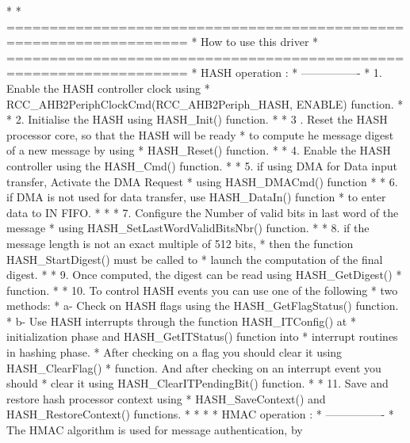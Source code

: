 \begin{DoxyVerb}*                               
*          ===================================================================      
*                                   How to use this driver
*          ===================================================================
*          HASH operation : 
*          ----------------                   
*         1. Enable the HASH controller clock using 
*            RCC_AHB2PeriphClockCmd(RCC_AHB2Periph_HASH, ENABLE) function.
*           
*         2. Initialise the HASH using HASH_Init() function. 
*               
*         3 . Reset the HASH processor core, so that the HASH will be ready 
*             to compute he message digest of a new message by using 
*             HASH_Reset() function.
*
*         4. Enable the HASH controller using the HASH_Cmd() function. 
*                
*         5. if using DMA for Data input transfer, Activate the DMA Request 
*            using HASH_DMACmd() function 
*                    
*         6. if DMA is not used for data transfer, use HASH_DataIn() function 
*            to enter data to IN FIFO.
*             
*          
*         7. Configure the Number of valid bits in last word of the message 
*            using HASH_SetLastWordValidBitsNbr() function.
*             
*         8. if the message length is not an exact multiple of 512 bits, 
*            then the function HASH_StartDigest() must be called to 
*            launch the computation of the final digest.     
*             
*         9. Once computed, the digest can be read using HASH_GetDigest() 
*            function.         
*                   
*        10. To control HASH events you can use one of the following 
*              two methods:
*               a- Check on HASH flags using the HASH_GetFlagStatus() function.  
*               b- Use HASH interrupts through the function HASH_ITConfig() at 
*                  initialization phase and HASH_GetITStatus() function into 
*                  interrupt routines in hashing phase.
*          After checking on a flag you should clear it using HASH_ClearFlag()
*          function. And after checking on an interrupt event you should 
*          clear it using HASH_ClearITPendingBit() function.     
*                     
*        11. Save and restore hash processor context using 
*            HASH_SaveContext() and HASH_RestoreContext() functions.     
*              
*
*            
*          HMAC operation : 
*          ----------------  
*          The HMAC algorithm is used for message authentication, by 

\end{DoxyVerb}
